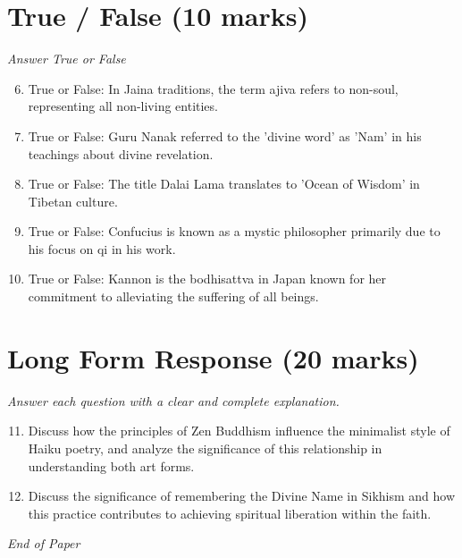 \documentclass[12pt]{article}
\begin{document}
\section*{True / False (10 marks)}
\textit{Answer True or False}
\begin{enumerate}[label=\arabic*.]
\setcounter{enumi}{5}
\item True or False: In Jaina traditions, the term ajiva refers to non-soul, representing all non-living entities.
\item True or False: Guru Nanak referred to the 'divine word' as 'Nam' in his teachings about divine revelation.
\item True or False: The title Dalai Lama translates to 'Ocean of Wisdom' in Tibetan culture.
\item True or False: Confucius is known as a mystic philosopher primarily due to his focus on qi in his work.
\item True or False: Kannon is the bodhisattva in Japan known for her commitment to alleviating the suffering of all beings.
\end{enumerate}

\section*{Long Form Response (20 marks)}
\textit{Answer each question with a clear and complete explanation.}
\begin{enumerate}[label=\arabic*.]
\setcounter{enumi}{10}
\item Discuss how the principles of Zen Buddhism influence the minimalist style of Haiku poetry, and analyze the significance of this relationship in understanding both art forms.
\item Discuss the significance of remembering the Divine Name in Sikhism and how this practice contributes to achieving spiritual liberation within the faith.
\end{enumerate}

\vfill
\noindent\textit{End of Paper}
\end{document}
